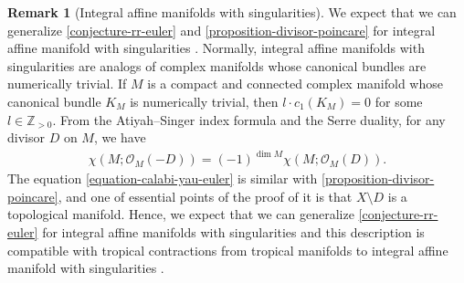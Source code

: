 \documentclass[a4paper,dvipdfmx,reqno,12pt]{amsart}
\theoremstyle{definition}
\newtheorem{remark}[theorem]{Remark}
\numberwithin{equation}{section}
\begin{document}
\begin{remark}[{Integral affine manifolds with singularities}]
\label{remark-iass}
We expect that we can generalize
\cref{conjecture-rr-euler} and 
\cref{proposition-divisor-poincare}
for integral affine manifold with singularities
\cite{MR2213573,MR2181810,MR4347312}.
Normally, integral affine manifolds with singularities
are analogs of complex manifolds whose canonical bundles
are numerically trivial. If $M$ is a compact and
connected complex manifold whose canonical bundle $K_M$ is
numerically trivial, then $l\cdot c_1(K_M)=0$ for 
some $l\in \mathbb{Z}_{>0}$.
From the Atiyah--Singer index formula and the Serre duality, 
for any divisor $D$ on $M$, we have
\begin{align}
\label{equation-calabi-yau-euler}
\chi(M;\mathcal{O}_M(-D))=(-1)^{\dim M}
\chi(M;\mathcal{O}_{M}(D)).
\end{align}
The equation \cref{equation-calabi-yau-euler} is
similar with
\cref{proposition-divisor-poincare}, and 
one of essential points of the proof of it
is that $X\setminus D$ is a topological manifold.
Hence, we expect that we can generalize
\cref{conjecture-rr-euler} for 
integral affine manifolds with singularities
and this description is compatible with
tropical contractions from tropical manifolds
to integral affine manifold with singularities
\cite{yamamoto2021tropical}.
\end{remark}
\end{document}
